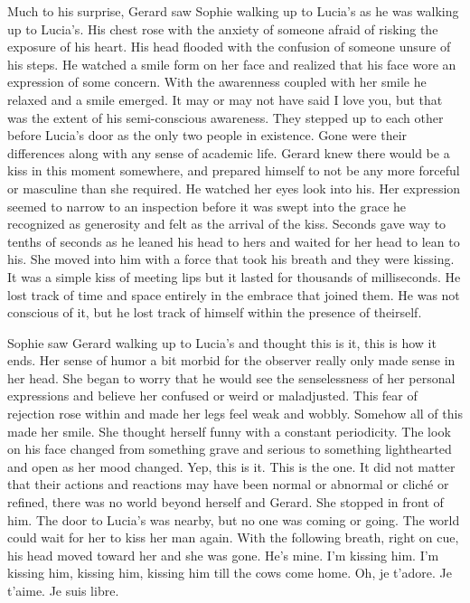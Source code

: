 Much to his surprise, Gerard saw Sophie walking up to Lucia's as he
was walking up to Lucia's.  His chest rose with the anxiety of someone
afraid of risking the exposure of his heart.  His head flooded with
the confusion of someone unsure of his steps.  He watched a smile form
on her face and realized that his face wore an expression of some
concern.  With the awarenness coupled with her smile he relaxed and a
smile emerged.  It may or may not have said I love you, but that was
the extent of his semi-conscious awareness.  They stepped up to each
other before Lucia's door as the only two people in existence.  Gone
were their differences along with any sense of academic life.  Gerard
knew there would be a kiss in this moment somewhere, and prepared
himself to not be any more forceful or masculine than she required.
He watched her eyes look into his.  Her expression seemed to narrow to
an inspection before it was swept into the grace he recognized as
generosity and felt as the arrival of the kiss.  Seconds gave way to
tenths of seconds as he leaned his head to hers and waited for her
head to lean to his.  She moved into him with a force that took his
breath and they were kissing.  It was a simple kiss of meeting lips
but it lasted for thousands of milliseconds.  He lost track of time
and space entirely in the embrace that joined them.  He was not
conscious of it, but he lost track of himself within the presence of
theirself.



Sophie saw Gerard walking up to Lucia's and thought this is it, this
is how it ends.  Her sense of humor a bit morbid for the observer
really only made sense in her head.  She began to worry that he would
see the senselessness of her personal expressions and believe her
confused or weird or maladjusted.  This fear of rejection rose within
and made her legs feel weak and wobbly.  Somehow all of this made her
smile.  She thought herself funny with a constant periodicity.  The
look on his face changed from something grave and serious to something
lighthearted and open as her mood changed.  Yep, this is it.  This is
the one.  It did not matter that their actions and reactions may have
been normal or abnormal or clich\'e or refined, there was no world
beyond herself and Gerard.  She stopped in front of him.  The door to
Lucia's was nearby, but no one was coming or going.  The world could
wait for her to kiss her man again.  With the following breath, right
on cue, his head moved toward her and she was gone.  He's mine.  I'm
kissing him.  I'm kissing him, kissing him, kissing him till the cows
come home.  Oh, je t'adore.  Je t'aime.  Je suis libre.



